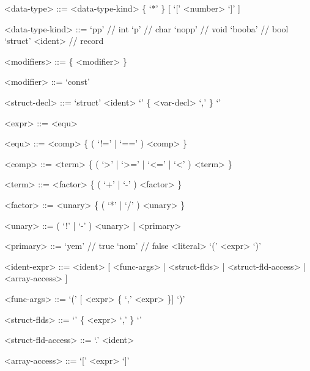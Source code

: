 \documentclass[12pt, a4paper]{article}
\begin{document}
\begin{grammar}
        <data-type> ::= <data-type-kind> \{ `*' \} [ `[' <number> `]' ]

        <data-type-kind> ::= `pp' // int
        \alt `p' // char
        \alt `nopp' // void
        \alt `booba' // bool
        \alt `struct' <ident> // record

        <modifiers> ::= \{ <modifier> \}

        <modifier> ::= `const'

        <struct-decl> ::= `struct' <ident> `{' \{ <var-decl> `,' \} `}'

        <expr> ::= <equ>

        <equ> ::= <comp> \{ ( `!=' | `==' ) <comp> \}

        <comp> ::= <term> \{ ( `>' | `>=' | `<=' | `<' ) <term> \}

        <term> ::= <factor> \{ ( `+' | `-' ) <factor> \}

        <factor> ::= <unary> \{ ( `*' | `/' ) <unary> \}

        <unary> ::= ( `!' | `-' ) <unary> | <primary>

        <primary> ::= `yem' // true
        \alt `nom' // false
        \alt <literal>
        \alt `(' <expr> `)'

        <ident-expr> ::= <ident> [ <func-args> | <struct-flds> | <struct-fld-access> | <array-access> ]

        <func-args> ::= `(' [ <expr> \{ `,' <expr> \}] `)'

        <struct-flds> ::= `{' \{ <expr> `,' \} `}'

        <struct-fld-access> ::= `.' <ident>

        <array-access> ::= `[' <expr> `]'
    \end{grammar}
\end{document}
